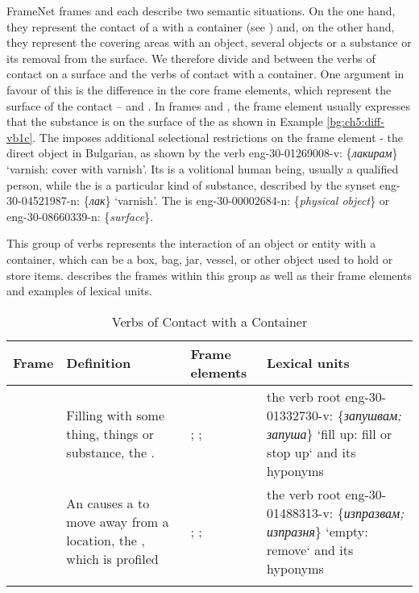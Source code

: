 \documentclass[output=paper,colorlinks,citecolor=brown]{langscibook}
\begin{document}
FrameNet frames  and  each describe two semantic situations. On the one hand, they represent the contact of a  with a container (see ) and, on the other hand, they represent the covering areas with an object, several objects or a substance or its removal from the surface. We therefore divide  and  between the verbs of contact on a surface and the verbs of contact with a container. One argument in favour of this is the difference in the core frame elements, which represent the surface of the contact --  and . In frames  and , the frame element  usually expresses that the substance is on the surface of the  as shown in Example \ref{bg:ch5:diff-vb1c}. The  imposes additional selectional restrictions on the frame element - the direct object in Bulgarian, as shown by the verb  eng-30-01269008-v: \{\textit{лакирам}\} ‘varnish: cover with varnish’. Its  is a volitional human being, usually a qualified person, while the  is a particular kind of substance, described by the synset eng-30-04521987-n: \{\textit{лак}\} `varnish’. The  is eng-30-00002684-n: \{\textit{physical object}\} or eng-30-08660339-n: \{\textit{surface}\}.

 \label{4.3.1.2}
This group of verbs represents the interaction of an object or entity with a container, which can be a box, bag, jar, vessel, or other object used to hold or store items.  describes the frames within this group as well as their frame elements and examples of lexical units.

\begin{table}
\small
\begin{tabularx}{\textwidth}{lQQQ}
\lsptoprule
Frame & Definition & Frame elements & Lexical units \\
\midrule
{} & Filling  with some thing, things or substance, the . & ; ;  & the verb root
eng-30-01332730-v: \{\textit{запушвам; запуша}\} ‘fill up: fill or stop up` and its hyponyms \\
\midrule
{} & An  causes a  to move away from a location, the , which is profiled & ; ;  & the verb root eng-30-01488313-v: \{\textit{изпразвам; изпразня}\} `empty: remove` and its hyponyms \\
\lspbottomrule
\end{tabularx}
\caption{Verbs of Contact with a Container}
\label{tab:chapter5handle:keytotable2}
\end{table}
\end{document}
